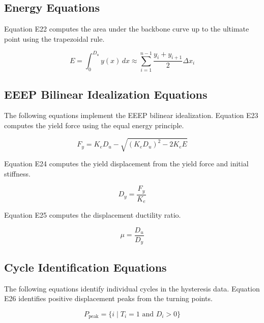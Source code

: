 \documentclass[11pt,a4paper]{article}
\begin{document}
\subsection{Energy Equations}

Equation E22 computes the area under the backbone curve up to the ultimate point using the trapezoidal rule.

\begin{equation}
E = \int_0^{D_u} y(x) \, dx \approx \sum_{i=1}^{n-1} \frac{y_i + y_{i+1}}{2} \Delta x_i
\tag{E22}
\label{eq:E22}
\end{equation}

\subsection{EEEP Bilinear Idealization Equations}

The following equations implement the EEEP bilinear idealization. Equation E23 computes the yield force using the equal energy principle.

\begin{equation}
F_y = K_e D_u - \sqrt{(K_e D_u)^2 - 2 K_e E}
\tag{E23}
\label{eq:E23}
\end{equation}

Equation E24 computes the yield displacement from the yield force and initial stiffness.

\begin{equation}
D_y = \frac{F_y}{K_e}
\tag{E24}
\label{eq:E24}
\end{equation}

Equation E25 computes the displacement ductility ratio.

\begin{equation}
\mu = \frac{D_u}{D_y}
\tag{E25}
\label{eq:E25}
\end{equation}

\subsection{Cycle Identification Equations}

The following equations identify individual cycles in the hysteresis data. Equation E26 identifies positive displacement peaks from the turning points.

\begin{equation}
P_{\text{peak}} = \{ i \mid T_i = 1 \text{ and } D_i > 0 \}
\tag{E26}
\label{eq:E26}
\end{equation}
\end{document}
